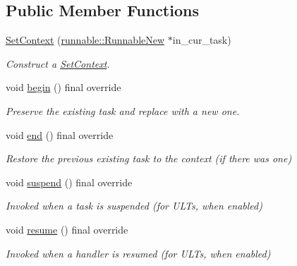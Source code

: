 \subsection*{Public Member Functions}
\begin{DoxyCompactItemize}
\item 
\hyperlink{structvt_1_1ctx_1_1_set_context_a6a7f8fd4952c150c2076801d108bacd6}{Set\+Context} (\hyperlink{structvt_1_1runnable_1_1_runnable_new}{runnable\+::\+Runnable\+New} $\ast$in\+\_\+cur\+\_\+task)
\begin{DoxyCompactList}\small\item\em Construct a {\ttfamily \hyperlink{structvt_1_1ctx_1_1_set_context}{Set\+Context}}. \end{DoxyCompactList}\item 
void \hyperlink{structvt_1_1ctx_1_1_set_context_aa882626f5fcf98cd6e8aa61c59395b5a}{begin} () final override
\begin{DoxyCompactList}\small\item\em Preserve the existing task and replace with a new one. \end{DoxyCompactList}\item 
void \hyperlink{structvt_1_1ctx_1_1_set_context_a17029268846a24e61fa35339e9bdcc10}{end} () final override
\begin{DoxyCompactList}\small\item\em Restore the previous existing task to the context (if there was one) \end{DoxyCompactList}\item 
void \hyperlink{structvt_1_1ctx_1_1_set_context_a6c371395c3d947e751d661f47157ba46}{suspend} () final override
\begin{DoxyCompactList}\small\item\em Invoked when a task is suspended (for U\+L\+Ts, when enabled) \end{DoxyCompactList}\item 
void \hyperlink{structvt_1_1ctx_1_1_set_context_a5d0e979f3d601900223d0db9bb8992d3}{resume} () final override
\begin{DoxyCompactList}\small\item\em Invoked when a handler is resumed (for U\+L\+Ts, when enabled) \end{DoxyCompactList}\end{DoxyCompactItemize}
